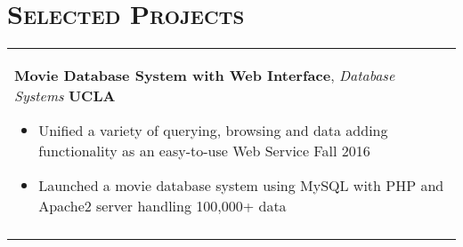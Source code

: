 \documentclass[a4paper,11pt]{article} %
\begin{document}
{\begin{tabular}{p{18.5cm}}
\end{tabular}


\section{\Large\bf\textsc{Selected Projects}}
\begin{tabular}{p{18.5cm}}

{\bf{Movie Database System with Web Interface}}, {\it{Database Systems}} \hfill {\bf{UCLA}}
\begin{itemize}
\item Unified a variety of querying, browsing and data adding functionality as an easy-to-use Web Service \hfill Fall 2016
\item Launched a movie database system using MySQL with PHP and Apache2 server handling 100,000+ data\vspace*{-\baselineskip}
\end{itemize} \\
\vspace{.1mm}


\end{tabular}}
\end{document}
